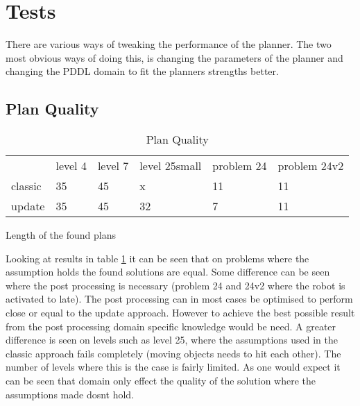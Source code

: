 \section{Tests}

%
%
%
%
%
%
%



	


	There are various ways of tweaking the performance of the planner. The two most obvious ways of doing this, is changing the parameters of the planner and changing the PDDL domain to fit the planners strengths better.

		\subsection{Plan Quality}
		
			
						\begin{table}[h]
							\centering
							\caption{Plan Quality}
							\label{quality}
							\begin{tabular}{llllll}
								& level 4 & level 7  & level 25small & problem 24 & problem 24v2\\
								classic & 35 & 45 & x&11&11\\
								update& 35 &45& 32&7&11\\
							\end{tabular}
							Length of the found plans
						\end{table}
			
			Looking at results in table \ref{quality} it can be seen that on problems where the assumption holds the found solutions are equal. Some difference can be seen where the post processing is necessary (problem 24 and 24v2 where the robot is activated to late). The post processing can in most cases be optimised to perform close or equal to the update approach. However to achieve the best possible result from the post processing domain specific knowledge would be need.	A greater difference is seen on levels such as level 25, where the assumptions used in the classic approach fails completely (moving objects needs to hit each other). The number of levels where this is the case is fairly limited. As one would expect it can be seen that domain only effect the quality of the solution where the assumptions made dosnt hold.
			
